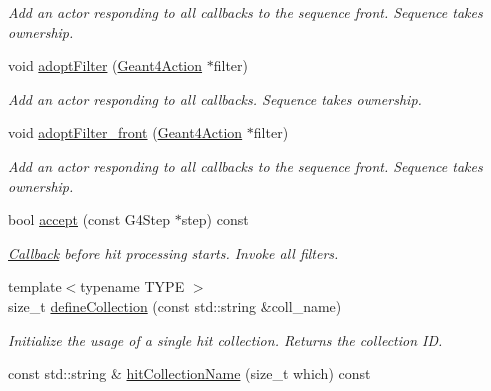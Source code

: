 \begin{DoxyCompactItemize}
\begin{DoxyCompactList}\small\item\em Add an actor responding to all callbacks to the sequence front. Sequence takes ownership. \item\end{DoxyCompactList}\item 
void \hyperlink{class_d_d4hep_1_1_simulation_1_1_geant4_sensitive_a54a242570db8df04bcf260d2e0ea3018}{adoptFilter} (\hyperlink{class_d_d4hep_1_1_simulation_1_1_geant4_action}{Geant4Action} $\ast$filter)
\begin{DoxyCompactList}\small\item\em Add an actor responding to all callbacks. Sequence takes ownership. \item\end{DoxyCompactList}\item 
void \hyperlink{class_d_d4hep_1_1_simulation_1_1_geant4_sensitive_a923ce4e474920fab8d2c7c6762e82ef4}{adoptFilter\_\-front} (\hyperlink{class_d_d4hep_1_1_simulation_1_1_geant4_action}{Geant4Action} $\ast$filter)
\begin{DoxyCompactList}\small\item\em Add an actor responding to all callbacks to the sequence front. Sequence takes ownership. \item\end{DoxyCompactList}\item 
bool \hyperlink{class_d_d4hep_1_1_simulation_1_1_geant4_sensitive_a8c6552ef34cfdbc36601fbcb996418c5}{accept} (const G4Step $\ast$step) const 
\begin{DoxyCompactList}\small\item\em \hyperlink{class_d_d4hep_1_1_callback}{Callback} before hit processing starts. Invoke all filters. \item\end{DoxyCompactList}\item 
{\footnotesize template$<$typename TYPE $>$ }\\size\_\-t \hyperlink{class_d_d4hep_1_1_simulation_1_1_geant4_sensitive_aecf98b3e67c2abd037499421bca5348f}{defineCollection} (const std::string \&coll\_\-name)
\begin{DoxyCompactList}\small\item\em Initialize the usage of a single hit collection. Returns the collection ID. \item\end{DoxyCompactList}\item 
const std::string \& \hyperlink{class_d_d4hep_1_1_simulation_1_1_geant4_sensitive_a8ec3aae450bedadc6b66a2f9fde69a6b}{hitCollectionName} (size\_\-t which) const 

\end{DoxyCompactItemize}
